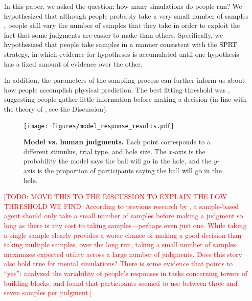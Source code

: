 \documentclass[10pt,letterpaper]{article}
\newcommand{\TODO}[1]{\textcolor{red}{[TODO: #1]}}
\begin{document}
In this paper, we asked the question: how many simulations do people run?
We hypothesized that although people probably take a very small number of samples \cite{Vul:2014ba}, people still vary the number of samples that they take in order to exploit the fact that some judgments are easier to make than others.
Specifically, we hypothesized that people take samples in a manner consistent with the SPRT strategy, in which evidence for hypotheses is accumulated until one hypothesis has a fixed amount of evidence over the other.

In addition, the parameters of the sampling process can further inform us about how people accomplish physical prediction.
The best fitting threshold was \threshold{}, suggesting people gather little information before making a decision (in line with the theory of \cite{Vul:2014ba}, see the Discussion).

\begin{figure}[t]
    \begin{center}
        \texttt{[image: figures/model\_response\_results.pdf]}
        \caption{\textbf{Model vs. human judgments.} Each point corresponds to a different stimulus, trial type, and hole size. The $x$-axis is the probability the model says the ball will go in the hole, and the $y$-axis is the proportion of participants saying the ball will go in the hole.}
        \label{fig:model-response-results}
    \end{center}
\end{figure}

\TODO{MOVE THIS TO THE DISCUSSION TO EXPLAIN THE LOW THRESHOLD WE FIND: According to previous research by \citeA{Vul:2014ba}, a sample-based agent should only take a small number of samples before making a judgment so long as there is any cost to taking samples---perhaps even just one. While taking a single sample clearly provides a worse chance of making a good decision than taking multiple samples, over the long run, taking a small number of samples maximizes expected utility across a large number of judgments. Does this story also hold true for mental simulations? There is some evidence that points to ``yes'': \citeA{Battaglia2013} analyzed the variability of people's responses in tasks concerning towers of building blocks, and found that participants seemed to use between three and seven samples per judgment.}
\end{document}
